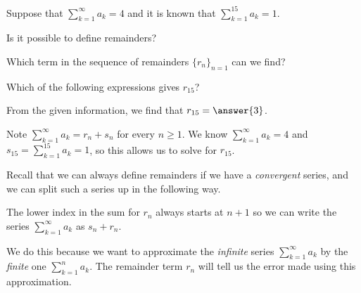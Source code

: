 \documentclass{ximera}
\author{Jim Talamo}
\begin{document}
\begin{exercise}

Suppose that $\sum_{k=1}^{\infty} a_k =4$ and it is known that $\sum_{k=1}^{15} a_k =1$.  

Is it possible to define remainders?
\begin{multipleChoice}
\end{multipleChoice}

Which term in the sequence of remainders $\{r_n\}_{n=1}$ can we find?

\begin{multipleChoice}
\end{multipleChoice}

\begin{exercise}

Which of the following expressions gives $r_{15}$?
\begin{multipleChoice}
\end{multipleChoice}

From the given information, we find that $r_{15} = \answer{3}$.

\begin{hint}
Note $\sum_{k=1}^{\infty} a_k = r_n+s_n$ for every $n\geq 1$. We know $\sum_{k=1}^{\infty} a_k= 4$ and $s_{15} = \sum_{k=1}^{15} a_k =1$, so this allows us to solve for $r_{15}$.

\end{hint}
\begin{feedback}
Recall that we can always define remainders if we have a \emph{convergent} series, and we can split such a series up in the following way.

\begin{image}
  \end{image}
  
  The lower index in the sum for $r_n$ always starts at $n+1$ so we can write the series $ \sum_{k=1}^{\infty} a_k$ as $s_n +r_n$.
  
  We do this because we want to approximate the \emph{infinite} series $\sum_{k=1}^{\infty} a_k$ by the \emph{finite} one $ \sum_{k=1}^{n} a_k$.  The remainder term $r_n$ will tell us the error made using this approximation.
\end{feedback}


\end{exercise}

\end{exercise}
\end{document}
